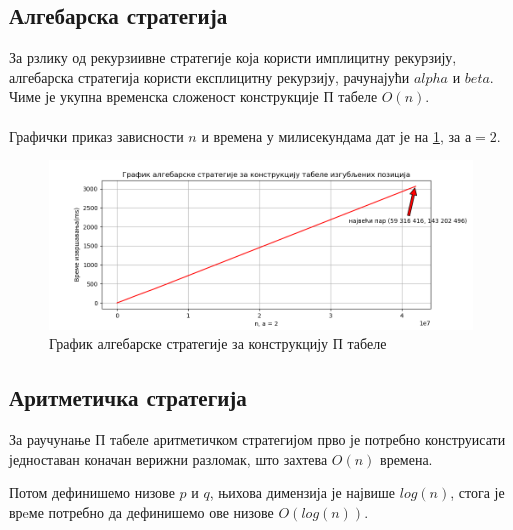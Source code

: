 \documentclass[a4paper]{article}
\begin{document}
\subsection{Алгебарска стратегија}

За рзлику од рекурзиивне стратегије која користи имплицитну рекурзију, алгебарска стратегија користи експлицитну рекурзију, рачунајући $ alpha $ и $ beta $. Чиме је укупна временска сложеност конструкције П табеле $ O(n) $.\\



\leavevmode\\
Графички приказ зависности $ n $ и времена у милисекундама дат је на \ref{fig:algebraic}, за $ а = 2 $.

\begin{figure}[H]
	\caption{График алгебарске стратегије за конструкцију П табеле}
	\label{fig:algebraic}
	\begin{center}
		\includegraphics[width=\textwidth]{algebraic.png}
	\end{center}
\end{figure}

\subsection{Аритметичка стратегија}

За раучунање П табеле аритметичком стратегијом прво је потребно конструисати једноставан коначан верижни разломак, што захтева $ O(n) $ времена. 

Потом дефинишемо низове $ p $ и $ q $, њихова димензија је највише $ log(n) $, стога је врeме потребно да дефинишемо ове низове $ O(log(n)) $.
\end{document}
